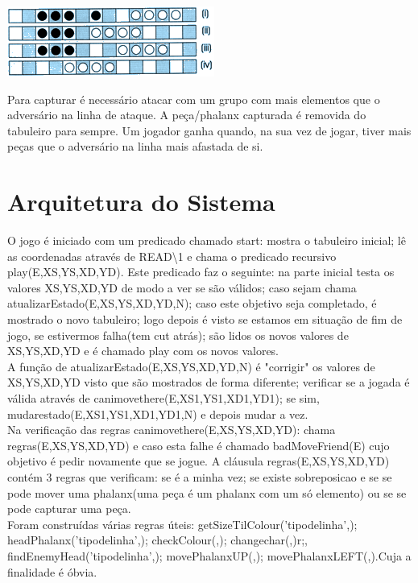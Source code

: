 \documentclass[a4paper]{article}
\begin{document}
\begin{center}
  \includegraphics[scale=0.60]{epa3.png}
\end{center}
Para capturar é necessário atacar com um grupo com mais elementos que o adversário na linha de ataque. A peça/phalanx capturada é removida do tabuleiro para sempre. Um jogador ganha quando, na sua vez de jogar, tiver mais peças que o adversário na linha mais afastada de si.\cite{rules}

\section{Arquitetura do Sistema}
O jogo é iniciado com um predicado chamado start: mostra o tabuleiro inicial; lê as coordenadas através de READ\textbackslash1 e chama o predicado recursivo play(E,XS,YS,XD,YD). Este predicado faz o seguinte: na parte inicial testa os valores XS,YS,XD,YD de modo a ver se são válidos; caso sejam chama atualizarEstado(E,XS,YS,XD,YD,N); caso este objetivo seja completado, é mostrado o novo tabuleiro; logo depois é visto se estamos em situação de fim de jogo, se estivermos falha(tem cut atrás); são lidos os novos valores de XS,YS,XD,YD e é chamado play com os novos valores.
\\\linebreak
A função de atualizarEstado(E,XS,YS,XD,YD,N) é "corrigir" os valores de XS,YS,XD,YD visto que são mostrados de forma diferente; verificar se a jogada é válida através de canimovethere(E,XS1,YS1,XD1,YD1); se sim, mudarestado(E,XS1,YS1,XD1,YD1,N) e depois mudar a vez.
\\\linebreak
Na verificação das regras canimovethere(E,XS,YS,XD,YD): chama regras(E,XS,YS,XD,YD) e caso esta falhe é chamado badMoveFriend(E) cujo objetivo é pedir novamente que se jogue. A cláusula regras(E,XS,YS,XD,YD) contém 3 regras que verificam: se é a minha vez; se existe sobreposicao e se se pode mover uma phalanx(uma peça é um phalanx com um só elemento) ou se se pode capturar uma peça.
\\\linebreak
Foram construídas várias regras úteis: getSizeTilColour('tipodelinha',); headPhalanx('tipodelinha',); checkColour(,); changechar(,)r;, findEnemyHead('tipodelinha',); movePhalanxUP(,); movePhalanxLEFT(,).Cuja a finalidade é óbvia.
\end{document}
